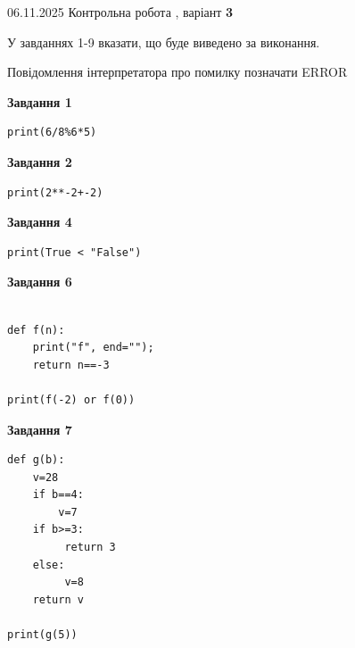 \documentclass[12pt, ukrainian]{article}
\begin{document}
{\Large{06.11.2025 Контрольна робота , варіант  \No \textbf { 3 }\par}}
{
\begin {large}
У завданнях 1-9 вказати, що буде виведено за виконання.

Повідомлення інтерпретатора про помилку позначати ERROR

\begin{minipage}[t]{7.5cm}

\begin{center}
\textbf{Завдання 1}
\end{center}

\begin{verbatim}
print(6/8%6*5)
\end{verbatim}



\begin{center}
\textbf{Завдання 2}
\end{center}

\begin{verbatim}
print(2**-2+-2)
\end{verbatim}



\begin{center}
\textbf{Завдання 4}
\end{center}

\begin{verbatim}
print(True < "False")
\end{verbatim}



\begin{center}
\textbf{Завдання 6}
\end{center}

\begin{verbatim}

def f(n):
    print("f", end="");
    return n==-3

print(f(-2) or f(0))
\end{verbatim}



\begin{center}
\textbf{Завдання 7}
\end{center}

\begin{verbatim}
def g(b):
    v=28
    if b==4: 
        v=7
    if b>=3:
         return 3
    else:
         v=8
    return v

print(g(5))
\end{verbatim}


\end{minipage}
\end{large}}
\end{document}
